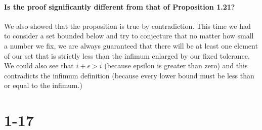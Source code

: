 \documentclass{article}
\begin{document}
\paragraph*{Is the proof significantly different from that of Proposition 1.21?}
We also showed that the proposition is true by contradiction. This time we had to consider a set bounded below and try to conjecture
that no matter how small a number we fix, we are always guaranteed that there will be at least one element of our set that 
is strictly less than the infimum enlarged by our fixed tolerance. We could also see that \(i + \epsilon > i\) 
(because epsilon is greater than zero) and this contradicts the infimum definition (because every
lower bound must be less than or equal to the infimum.)
\pagebreak
\section*{1-17}
\end{document}
